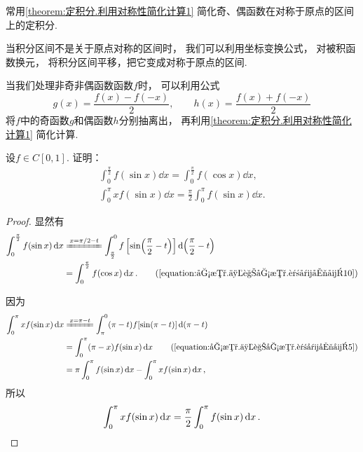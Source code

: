 \begin{remark}
常用\cref{theorem:定积分.利用对称性简化计算1} 简化奇、偶函数在对称于原点的区间上的定积分.

当积分区间不是关于原点对称的区间时，
我们可以利用坐标变换公式，
对被积函数换元，
将积分区间平移，把它变成对称于原点的区间.

当我们处理非奇非偶函数函数\(f\)时，
可以利用公式\[
	g(x) = \frac{f(x) - f(-x)}{2}, \qquad
	h(x) = \frac{f(x) + f(-x)}{2}
\]
将\(f\)中的奇函数\(g\)和偶函数\(h\)分别抽离出，
再利用\cref{theorem:定积分.利用对称性简化计算1} 简化计算.
\end{remark}

\begin{example}
设\(f \in C[0,1]\).
证明：\begin{gather}
	\int_0^{\frac\pi2} f(\sin x) \dd{x}
	= \int_0^{\frac\pi2} f(\cos x) \dd{x}, \\
	\int_0^\pi x f(\sin x) \dd{x}
	= \frac{\pi}{2} \int_0^\pi f(\sin x) \dd{x}.
\end{gather}
\begin{proof}
显然有\begin{align*}
	\int_0^{\frac\pi2} f(\sin x) \dd{x}
	&\xlongequal{x = \pi/2-t}
		\int_{\frac\pi2}^0 f\left[\sin(\frac{\pi}{2}-t)\right] \dd(\frac{\pi}{2}-t) \\
	&= \int_0^{\frac\pi2} f(\cos x) \dd{x}.
		\tag{\cref{equation:函数.三角函数.诱导公式10}}
\end{align*}

因为\begin{align*}
	\int_0^\pi x f(\sin x) \dd{x}
	&\xlongequal{x = \pi-t}
		\int_{\pi}^0 (\pi-t) f[\sin(\pi-t)] \dd(\pi-t) \\
	&= \int_0^\pi (\pi-x) f(\sin x) \dd{x}
		\tag{\cref{equation:函数.三角函数.诱导公式5}} \\
	&= \pi \int_0^\pi f(\sin x) \dd{x}
		- \int_0^\pi x f(\sin x) \dd{x},
\end{align*}
所以\[
	\int_0^\pi x f(\sin x) \dd{x}
	= \frac{\pi}{2} \int_0^\pi f(\sin x) \dd{x}.
	\qedhere
\]
\end{proof}
\end{example}


